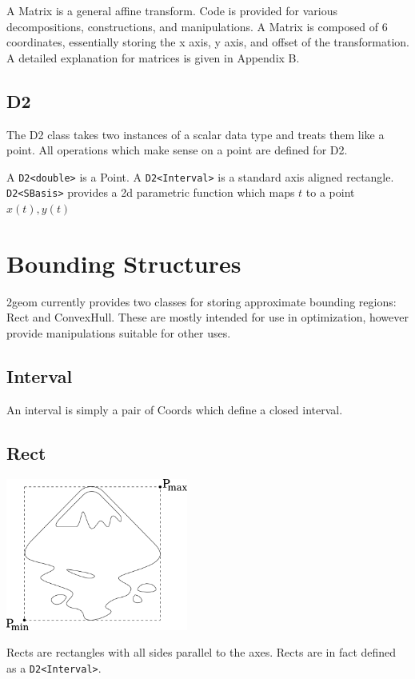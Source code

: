 \documentclass[openany]{book}
\newcommand{\code}[1]{\textsf{#1}}
\begin{document}
A \code{Matrix} is a general affine transform.  Code is provided for
various decompositions, constructions, and manipulations.  A
\code{Matrix} is composed of 6 coordinates, essentially storing the
x axis, y axis, and offset of the transformation.  A detailed
explanation for matrices is given in Appendix B.

\subsection{D2}
The \code{D2} class takes two instances of a scalar data type and treats them like a point.  All operations which make sense on a point are defined for D2.

A \verb|D2<double>| is a \code{Point}.  A \verb|D2<Interval>| is a standard axis aligned rectangle.
\verb|D2<SBasis>| provides a 2d parametric function which maps $t$ to a point $x(t), y(t)$

\section{Bounding Structures}

2geom currently provides two classes for storing approximate bounding
regions: \code{Rect} and \code{ConvexHull}.  These are mostly intended
for use in optimization, however provide manipulations suitable for
other uses.

\subsection{Interval}

An interval is simply a pair of Coords which define a closed interval.

\subsection{Rect}

\includegraphics[height=50mm]{media/rect.png}

\code{Rect}s are rectangles with all sides parallel to the axes. 
\code{Rect}s are in fact defined as a \verb|D2<Interval>|.
\end{document}
